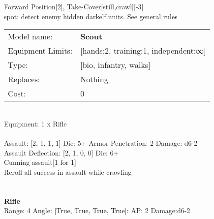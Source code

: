 \noindent Forward Position[2], Take-Cover[still,crawl][-3]\\ 
spot: detect enemy hidden darkelf.units. See general rules\\ 


\noindent
\begin{tabular}{ll}
Model name: &{\bf Scout } \\
Equipment Limits: &[hands:2, training:1, independent:∞] \\
Type: &[bio, infantry, walks] \\
Replaces: &Nothing \\
Cost: & 0\\
\end{tabular}
\ \\
Equipment: 1 x Rifle \\
\ \\
Assault: [2, 1, 1, 1] Die: 5+ Armor Penetration: 2 Damage: d6-2 \\
Assault Deflection: [2, 1, 0, 0] Die: 6+\\
\indent Cunning assault[1 for 1]\\ 
Reroll all success in assault while crawling\\ 
 
\ \\

\ \\
{\bf Rifle } \\



Range: 4  Angle: [True, True, True, True]: AP: 2 Damage:d6-2 \\




 
\ \\



